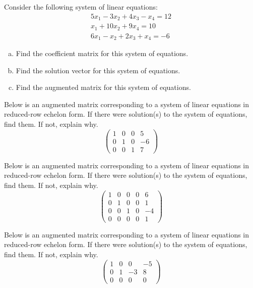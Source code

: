 \documentclass[12pt,letterpaper]{exam}
\begin{document}
\begin{questions}
\newpage
\question[10] Consider the following system of linear equations:
	\[
	\begin{aligned}
	5x_1 - 3x_2 + 4x_3 - x_4= 12 \\
	x_1 + 10x_2 + 9x_4= 10 \\
	6x_1 - x_2 + 2x_3 + x_4= -6
	\end{aligned}
	\]

\begin{enumerate}[(a)]
\item Find the coefficient matrix for this system of equations. 
\item Find the solution vector for this system of equations.
\item Find the augmented matrix for this system of equations. 
\end{enumerate}



\newpage
\question[10] Below is an augmented matrix corresponding to a system of linear equations in reduced-row echelon form. If there were solution(s) to the system of equations, find them. If not, explain why. 
	\[
	\begin{pmatrix}
	1 & 0 & 0 & 5 \\
	0 & 1 & 0 & -6 \\
	0 & 0 & 1 & 7
	\end{pmatrix}	
	\]



\newpage
\question[10] Below is an augmented matrix corresponding to a system of linear equations in reduced-row echelon form. If there were solution(s) to the system of equations, find them. If not, explain why. 
	\[
	\begin{pmatrix}
	1 & 0 & 0 & 0 & 6 \\
	0 & 1 & 0 & 0 & 1 \\
	0 & 0 & 1 & 0 & -4 \\
	0 & 0 & 0 & 0 & 1 
	\end{pmatrix}	
	\]



\newpage
\question[10] Below is an augmented matrix corresponding to a system of linear equations in reduced-row echelon form. If there were solution(s) to the system of equations, find them. If not, explain why. 
	\[
	\begin{pmatrix}
	1 & 0 & 0 & -5 \\
	0 & 1 & -3 & 8 \\
	0 & 0 & 0 & 0
	\end{pmatrix}	
	\]




\end{questions}
\end{document}
